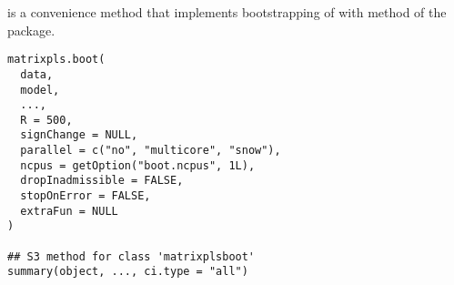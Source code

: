 \documentclass[a4paper]{book}
\begin{document}
%
\begin{Description}\relax
{} is a convenience method that implements bootstrapping of 
with  method of the  package.
\end{Description}
%
\begin{Usage}
\begin{verbatim}
matrixpls.boot(
  data,
  model,
  ...,
  R = 500,
  signChange = NULL,
  parallel = c("no", "multicore", "snow"),
  ncpus = getOption("boot.ncpus", 1L),
  dropInadmissible = FALSE,
  stopOnError = FALSE,
  extraFun = NULL
)

## S3 method for class 'matrixplsboot'
summary(object, ..., ci.type = "all")
\end{verbatim}
\end{Usage}
%
\end{document}
